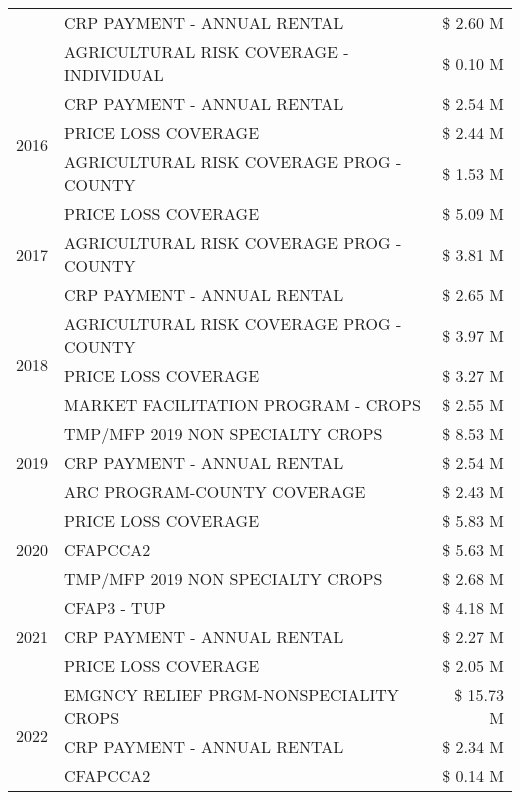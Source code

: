 \begin{tabular}{llr}
 & CRP PAYMENT - ANNUAL RENTAL & \$ 2.60 M \\
 & AGRICULTURAL RISK COVERAGE - INDIVIDUAL & \$ 0.10 M \\
\cline{1-3}
\multirow[t]{3}{*}{2016} & CRP PAYMENT - ANNUAL RENTAL & \$ 2.54 M \\
 & PRICE LOSS COVERAGE & \$ 2.44 M \\
 & AGRICULTURAL RISK COVERAGE PROG - COUNTY & \$ 1.53 M \\
\cline{1-3}
\multirow[t]{3}{*}{2017} & PRICE LOSS COVERAGE & \$ 5.09 M \\
 & AGRICULTURAL RISK COVERAGE PROG - COUNTY & \$ 3.81 M \\
 & CRP PAYMENT - ANNUAL RENTAL & \$ 2.65 M \\
\cline{1-3}
\multirow[t]{3}{*}{2018} & AGRICULTURAL RISK COVERAGE PROG - COUNTY & \$ 3.97 M \\
 & PRICE LOSS COVERAGE & \$ 3.27 M \\
 & MARKET FACILITATION PROGRAM - CROPS & \$ 2.55 M \\
\cline{1-3}
\multirow[t]{3}{*}{2019} & TMP/MFP 2019 NON SPECIALTY CROPS & \$ 8.53 M \\
 & CRP PAYMENT - ANNUAL RENTAL & \$ 2.54 M \\
 & ARC PROGRAM-COUNTY COVERAGE & \$ 2.43 M \\
\cline{1-3}
\multirow[t]{3}{*}{2020} & PRICE LOSS COVERAGE & \$ 5.83 M \\
 & CFAPCCA2 & \$ 5.63 M \\
 & TMP/MFP 2019 NON SPECIALTY CROPS & \$ 2.68 M \\
\cline{1-3}
\multirow[t]{3}{*}{2021} & CFAP3 - TUP & \$ 4.18 M \\
 & CRP PAYMENT - ANNUAL RENTAL & \$ 2.27 M \\
 & PRICE LOSS COVERAGE & \$ 2.05 M \\
\cline{1-3}
\multirow[t]{3}{*}{2022} & EMGNCY RELIEF PRGM-NONSPECIALITY CROPS & \$ 15.73 M \\
 & CRP PAYMENT - ANNUAL RENTAL & \$ 2.34 M \\
 & CFAPCCA2 & \$ 0.14 M \\
\cline{1-3}
\bottomrule
\end{tabular}
